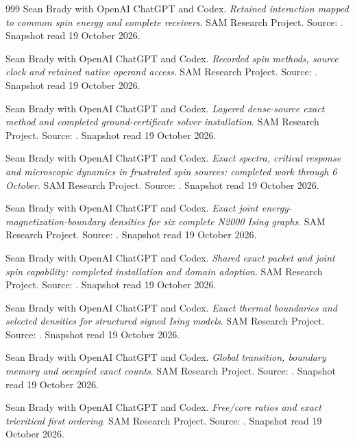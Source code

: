 \begin{thebibliography}{999}
 Sean Brady with OpenAI ChatGPT and Codex. \emph{Retained interaction mapped to common spin energy and complete receivers}. SAM Research Project. Source: . Snapshot read 19 October 2026.

 Sean Brady with OpenAI ChatGPT and Codex. \emph{Recorded spin methods, source clock and retained native operand access}. SAM Research Project. Source: . Snapshot read 19 October 2026.

 Sean Brady with OpenAI ChatGPT and Codex. \emph{Layered dense-source exact method and completed ground-certificate solver installation}. SAM Research Project. Source: . Snapshot read 19 October 2026.

 Sean Brady with OpenAI ChatGPT and Codex. \emph{Exact spectra, critical response and microscopic dynamics in frustrated spin sources: completed work through 6 October}. SAM Research Project. Source: . Snapshot read 19 October 2026.

 Sean Brady with OpenAI ChatGPT and Codex. \emph{Exact joint energy-magnetization-boundary densities for six complete N2000 Ising graphs}. SAM Research Project. Source: . Snapshot read 19 October 2026.

 Sean Brady with OpenAI ChatGPT and Codex. \emph{Shared exact packet and joint spin capability: completed installation and domain adoption}. SAM Research Project. Source: . Snapshot read 19 October 2026.

 Sean Brady with OpenAI ChatGPT and Codex. \emph{Exact thermal boundaries and selected densities for structured signed Ising models}. SAM Research Project. Source: . Snapshot read 19 October 2026.

 Sean Brady with OpenAI ChatGPT and Codex. \emph{Global transition, boundary memory and occupied exact counts}. SAM Research Project. Source: . Snapshot read 19 October 2026.

 Sean Brady with OpenAI ChatGPT and Codex. \emph{Free/core ratios and exact tricritical first ordering}. SAM Research Project. Source: . Snapshot read 19 October 2026.


\end{thebibliography}
